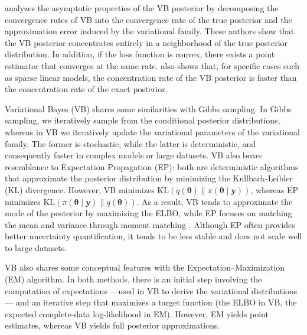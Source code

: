 
\cite{zhang2020convergence} analyzes the asymptotic properties of the VB posterior by decomposing the convergence rates of VB into the convergence rate of the true posterior and the approximation error induced by the variational family. These authors show that the VB posterior concentrates entirely in a neighborhood of the true posterior distribution. In addition, if the loss function is convex, there exists a point estimator that converges at the same rate. \cite{zhang2020convergence} also shows that, for specific cases such as sparse linear models, the concentration rate of the VB posterior is faster than the concentration rate of the exact posterior.

Variational Bayes (VB) shares some similarities with Gibbs sampling. In Gibbs sampling, we iteratively sample from the conditional posterior distributions, whereas in VB we iteratively update the variational parameters of the variational family. The former is stochastic, while the latter is deterministic, and consequently faster in complex models or large datasets. VB also bears resemblance to Expectation Propagation (EP): both are deterministic algorithms that approximate the posterior distribution by minimizing the Kullback-Leibler (KL) divergence. However, VB minimizes $\text{KL}(q(\boldsymbol{\theta}) \| \pi(\boldsymbol{\theta} \mid \boldsymbol{y}))$, whereas EP minimizes $\text{KL}(\pi(\boldsymbol{\theta} \mid \boldsymbol{y}) \| q(\boldsymbol{\theta}))$. As a result, VB tends to approximate the mode of the posterior by maximizing the ELBO, while EP focuses on matching the mean and variance through moment matching \cite{bishop2006pattern,gelman2021bayesian}. Although EP often provides better uncertainty quantification, it tends to be less stable and does not scale well to large datasets.

VB also shares some conceptual features with the Expectation--Maximization (EM) algorithm. In both methods, there is an initial step involving the computation of expectations —used in VB to derive the variational distributions— and an iterative step that maximizes a target function (the ELBO in VB, the expected complete-data log-likelihood in EM). However, EM yields point estimates, whereas VB yields full posterior approximations.\\

